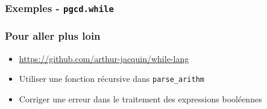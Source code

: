 \documentclass{beamer}
\begin{document}
\begin{frame}[fragile]
\frametitle{Exemples - \texttt{pgcd.while}}
\begin{scriptsize}

\end{scriptsize}
\end{frame}

\begin{frame}
\frametitle{Pour aller plus loin}
\begin{itemize}
\item \url{https://github.com/arthur-jacquin/while-lang}
\item Utiliser une fonction récursive dans \texttt{parse\_arithm}
\item Corriger une erreur dans le traitement des expressions booléennes
\end{itemize}
\end{frame}
\end{document}

